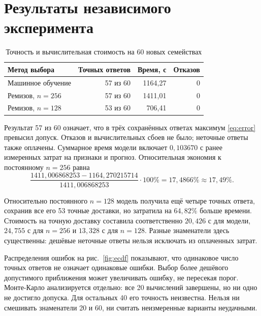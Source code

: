 \section{Результаты независимого эксперимента}
\begin{table}[!ht]\centering\caption{Точность и вычислительная стоимость на 60 новых семействах}\label{tab:main}
\begin{tabular}{lrrr}\toprule Метод выбора&Точных ответов&Время, с&Отказов\\\midrule
Машинное обучение&57 из 60&1164,27&0\\
Ремизов, $n=256$&57 из 60&1411,01&0\\
Ремизов, $n=128$&53 из 60&706,41&0\\\bottomrule\end{tabular}\end{table}
Результат 57 из 60 означает, что в трёх сохранённых ответах максимум \eqref{eq:error} превысил допуск. Отказов и вычислительных сбоев не было; неточные ответы также оплачены. Суммарное время модели включает $0{,}103670$ с ранее измеренных затрат на признаки и прогноз. Относительная экономия к постоянному $n=256$ равна
\begin{equation}\label{eq:saving}
\frac{1411{,}006868253-1164{,}270215714}{1411{,}006868253}\cdot100\%
=17{,}4866\%\approx17{,}49\%.
\end{equation}

\clearpage
{}
Относительно постоянного $n=128$ модель получила ещё четыре точных ответа, сохранив все его 53 точные доставки, но затратила на $64{,}82\%$ больше времени. Стоимость на точную доставку составила соответственно $20{,}426$ с для модели, $24{,}755$ с для $n=256$ и $13{,}328$ с для $n=128$. Разные знаменатели здесь существенны: дешёвые неточные ответы нельзя исключать из оплаченных затрат.

Распределения ошибок на рис.~\ref{fig:ecdf} показывают, что одинаковое число точных ответов не означает одинаковые ошибки. Выбор более дешёвого допустимого приближения может увеличивать ошибку, не пересекая порог. Монте-Карло анализируется отдельно: все 20 вычислений завершены, но ни одно не достигло допуска. Для остальных 40 его точность неизвестна. Нельзя ни смешивать знаменатели 20 и 60, ни считать неизмеренные варианты неудачными.

